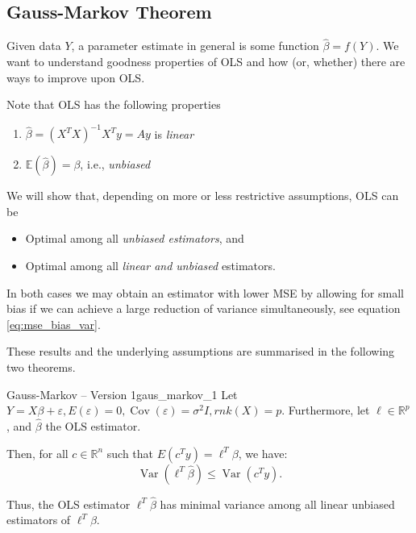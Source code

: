 \documentclass[11pt, %
	oneside, %
	english, %
	onehalfspacing, %
	]{article} %
\numberwithin{equation}{section}
\begin{document}
\subsection{Gauss-Markov Theorem}

Given data $Y$, a parameter estimate in general is some function $\hat{\beta} = f(Y)$. We want to understand goodness properties of OLS and how (or, whether) there are ways to improve upon OLS.

Note that OLS has the following properties

\begin{enumerate}
    \item $\hat{\beta} = (X^T X)^{-1} X^T y = Ay$ is \emph{linear}
    \item  $\mathbb{E}(\hat{\beta}) = \beta$, i.e., \emph{unbiased}
\end{enumerate}

We will show that, depending on more or less restrictive assumptions, OLS can be
\begin{itemize}
    \item Optimal among all \emph{unbiased estimators}, and
    \item Optimal among all \emph{linear and unbiased} estimators.
\end{itemize}
In both cases we may obtain an estimator with lower MSE by allowing for small bias if we can achieve a large reduction of variance simultaneously, see equation \eqref{eq:mse_bias_var}.

These results and the underlying assumptions are summarised in the following two theorems.

\begin{theorem}{Gauss-Markov -- Version 1}{gaus_markov_1}
    Let $Y=X \beta+\varepsilon, E(\varepsilon)=0, \operatorname{Cov}(\varepsilon)=\sigma^2 I, r n k(X)=p$. Furthermore, let $\ell \in \mathbb{R}^p$, and $\hat{\beta}$ the OLS estimator.

    Then, for all $c \in \mathbb{R}^n$ such that $E\left(c^T y\right)=\ell^T \beta$, we have: $$\operatorname{Var}\left(\ell^T \hat{\beta}\right) \leq \operatorname{Var}\left(c^T y\right).$$
\end{theorem}

Thus, the OLS estimator $\ell^T \hat{\beta}$ has minimal variance among all linear unbiased estimators of $\ell^T \beta$.
\end{document}
